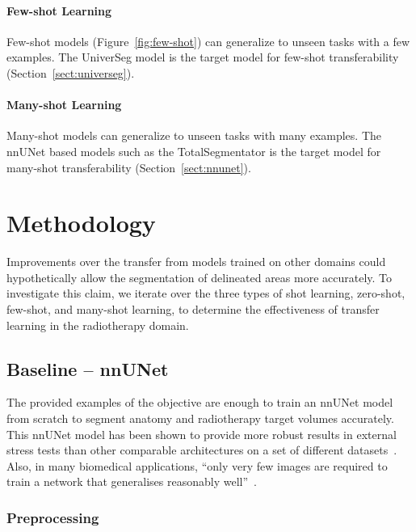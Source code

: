 \documentclass[12pt,twoside]{report}
\begin{document}
\subsubsection{Few-shot Learning}\label{sect:few-shot-learning}

Few-shot models (Figure~\ref{fig:few-shot}) can generalize to unseen tasks with a few examples. The UniverSeg model is the target model for few-shot transferability (Section~\ref{sect:universeg}).

\subsubsection{Many-shot Learning}\label{sect:many-shot-learning}

Many-shot models can generalize to unseen tasks with many examples. The nnUNet based models such as the TotalSegmentator is the target model for many-shot transferability (Section~\ref{sect:nnunet}).

\chapter{Methodology}\label{sect:methodology}

Improvements over the transfer from models trained on other domains could hypothetically allow the segmentation of delineated areas more accurately. To investigate this claim, we iterate over the three types of shot learning, zero-shot, few-shot, and many-shot learning, to determine the effectiveness of transfer learning in the radiotherapy domain.

\section{Baseline -- nnUNet}

The provided examples of the objective are enough to train an nnUNet model from scratch to segment anatomy and radiotherapy target volumes accurately. This nnUNet model has been shown to provide more robust results in external stress tests than other comparable architectures on a set of different datasets~\cite{isensee2024nnunet}. Also, in many biomedical applications, ``only very few images are required to train a network that generalises reasonably well''~\cite{DBLP:journals/corr/CicekALBR16}.

\subsection{Preprocessing}
\end{document}
